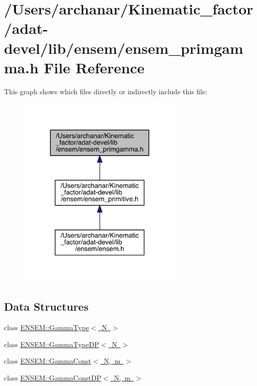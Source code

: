 \hypertarget{adat-devel_2lib_2ensem_2ensem__primgamma_8h}{}\section{/\+Users/archanar/\+Kinematic\+\_\+factor/adat-\/devel/lib/ensem/ensem\+\_\+primgamma.h File Reference}
\label{adat-devel_2lib_2ensem_2ensem__primgamma_8h}
This graph shows which files directly or indirectly include this file\+:
\nopagebreak
\begin{figure}[H]
\begin{center}
\leavevmode
\includegraphics[width=228pt]{d1/df8/adat-devel_2lib_2ensem_2ensem__primgamma_8h__dep__incl}
\end{center}
\end{figure}
\subsection*{Data Structures}
\begin{DoxyCompactItemize}
\item 
class \mbox{\hyperlink{classENSEM_1_1GammaType}{E\+N\+S\+E\+M\+::\+Gamma\+Type$<$ N $>$}}
\item 
class \mbox{\hyperlink{classENSEM_1_1GammaTypeDP}{E\+N\+S\+E\+M\+::\+Gamma\+Type\+D\+P$<$ N $>$}}
\item 
class \mbox{\hyperlink{classENSEM_1_1GammaConst}{E\+N\+S\+E\+M\+::\+Gamma\+Const$<$ N, m $>$}}
\item 
class \mbox{\hyperlink{classENSEM_1_1GammaConstDP}{E\+N\+S\+E\+M\+::\+Gamma\+Const\+D\+P$<$ N, m $>$}}
\end{DoxyCompactItemize}
